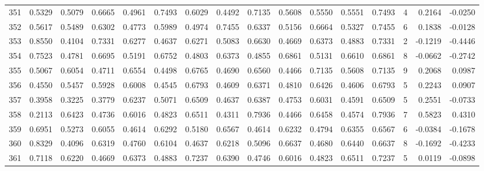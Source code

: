 \begin{tabular}{lrrrrrrrrrrrrrrr}
351 &      0.5329 &  0.5079 &  0.6665 &  0.4961 &  0.7493 &  0.6029 &  0.4492 &  0.7135 &  0.5608 &  0.5550 &   0.5551 &     0.7493 &      4 &                    0.2164 &                    -0.0250 \\
352 &      0.5617 &  0.5489 &  0.6302 &  0.4773 &  0.5989 &  0.4974 &  0.7455 &  0.6337 &  0.5156 &  0.6664 &   0.5327 &     0.7455 &      6 &                    0.1838 &                    -0.0128 \\
353 &      0.8550 &  0.4104 &  0.7331 &  0.6277 &  0.4637 &  0.6271 &  0.5083 &  0.6630 &  0.4669 &  0.6373 &   0.4883 &     0.7331 &      2 &                   -0.1219 &                    -0.4446 \\
354 &      0.7523 &  0.4781 &  0.6695 &  0.5191 &  0.6752 &  0.4803 &  0.6373 &  0.4855 &  0.6861 &  0.5131 &   0.6610 &     0.6861 &      8 &                   -0.0662 &                    -0.2742 \\
355 &      0.5067 &  0.6054 &  0.4711 &  0.6554 &  0.4498 &  0.6765 &  0.4690 &  0.6560 &  0.4466 &  0.7135 &   0.5608 &     0.7135 &      9 &                    0.2068 &                     0.0987 \\
356 &      0.4550 &  0.5457 &  0.5928 &  0.6008 &  0.4545 &  0.6793 &  0.4609 &  0.6371 &  0.4810 &  0.6426 &   0.4606 &     0.6793 &      5 &                    0.2243 &                     0.0907 \\
357 &      0.3958 &  0.3225 &  0.3779 &  0.6237 &  0.5071 &  0.6509 &  0.4637 &  0.6387 &  0.4753 &  0.6031 &   0.4591 &     0.6509 &      5 &                    0.2551 &                    -0.0733 \\
358 &      0.2113 &  0.6423 &  0.4736 &  0.6016 &  0.4823 &  0.6511 &  0.4311 &  0.7936 &  0.4466 &  0.6458 &   0.4574 &     0.7936 &      7 &                    0.5823 &                     0.4310 \\
359 &      0.6951 &  0.5273 &  0.6055 &  0.4614 &  0.6292 &  0.5180 &  0.6567 &  0.4614 &  0.6232 &  0.4794 &   0.6355 &     0.6567 &      6 &                   -0.0384 &                    -0.1678 \\
360 &      0.8329 &  0.4096 &  0.6319 &  0.4760 &  0.6104 &  0.4637 &  0.6218 &  0.5096 &  0.6637 &  0.4680 &   0.6440 &     0.6637 &      8 &                   -0.1692 &                    -0.4233 \\
361 &      0.7118 &  0.6220 &  0.4669 &  0.6373 &  0.4883 &  0.7237 &  0.6390 &  0.4746 &  0.6016 &  0.4823 &   0.6511 &     0.7237 &      5 &                    0.0119 &                    -0.0898 \\

\end{tabular}
